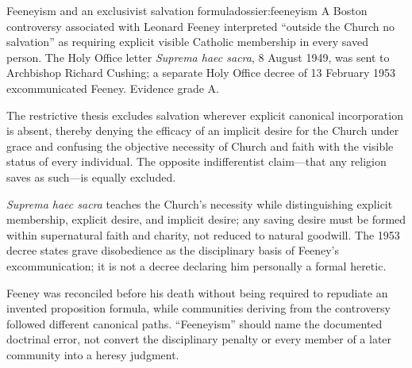 \begin{heresydossier}{Feeneyism and an exclusivist salvation formula}{dossier:feeneyism}
\objectfield A Boston controversy associated with Leonard Feeney interpreted ``outside the Church no salvation'' as requiring explicit visible Catholic membership in every saved person. The Holy Office letter \emph{Suprema haec sacra}, 8 August 1949, was sent to Archbishop Richard Cushing; a separate Holy Office decree of 13 February 1953 excommunicated Feeney. Evidence grade A.

\propositionfield The restrictive thesis excludes salvation wherever explicit canonical incorporation is absent, thereby denying the efficacy of an implicit desire for the Church under grace and confusing the objective necessity of Church and faith with the visible status of every individual. The opposite indifferentist claim---that any religion saves as such---is equally excluded.

\responsefield \emph{Suprema haec sacra} teaches the Church's necessity while distinguishing explicit membership, explicit desire, and implicit desire; any saving desire must be formed within supernatural faith and charity, not reduced to natural goodwill. The 1953 decree states grave disobedience as the disciplinary basis of Feeney's excommunication; it is not a decree declaring him personally a formal heretic.

\aftermathfield Feeney was reconciled before his death without being required to repudiate an invented proposition formula, while communities deriving from the controversy followed different canonical paths. ``Feeneyism'' should name the documented doctrinal error, not convert the disciplinary penalty or every member of a later community into a heresy judgment.
\end{heresydossier}

